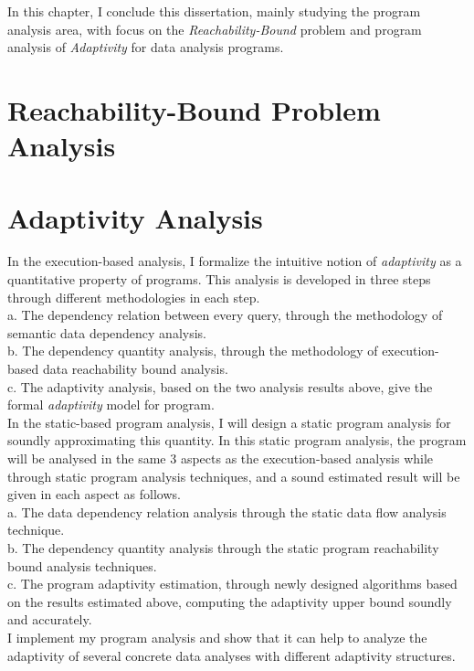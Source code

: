 In this chapter, I conclude this dissertation, mainly studying the program analysis area, 
with focus on the \emph{Reachability-Bound} problem
and program analysis of \emph{Adaptivity} for data analysis programs.

\section{Reachability-Bound Problem Analysis}
\label{sec:conclude-reachability}

\section{Adaptivity Analysis}
\label{sec:conclude-adapt}
In the execution-based analysis, I formalize the intuitive notion of \emph{adaptivity} as a quantitative 
   property of programs. This analysis is developed in three steps through different methodologies in each step. 
   \\
	a. The dependency relation between every query, through the methodology of semantic data dependency analysis.
   \\
	b. The dependency quantity analysis, through the methodology of execution-based data reachability bound analysis.
   \\
	c. The adaptivity analysis, based on the two analysis results above, give the formal \emph{adaptivity} model 
   for program.
   \\   
	In the static-based program analysis, I will design a static program analysis for soundly approximating this quantity.
   In this static program analysis, the program will be analysed in the same 3 aspects as the execution-based analysis 
   while through static program analysis techniques, and a sound estimated result will be given in each aspect as follows.
   \\
	a. The data dependency relation analysis through the static data flow analysis technique.
   \\
	b. The dependency quantity analysis through the static program reachability bound analysis techniques.
   \\
	c. The program adaptivity estimation, through newly designed algorithms based on the results estimated above, 
   computing the adaptivity upper bound soundly 
   and accurately.
   \\
I implement my program analysis and show that it can help to analyze the adaptivity of several concrete data analyses with different adaptivity structures.

